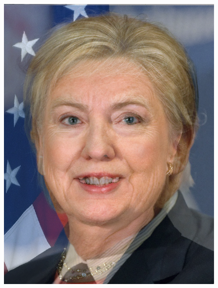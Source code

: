 \documentclass[a4paper]{article}
\begin{document}
\begin{figure}[htp]
{\begin{minipage}[b]{0.31\columnwidth}
{\includegraphics[width=1\columnwidth]{HT.png} 
}
\label{fig:3-4:b}
\end{minipage}
}
\hfil
{}
\end{figure}
\end{document}
